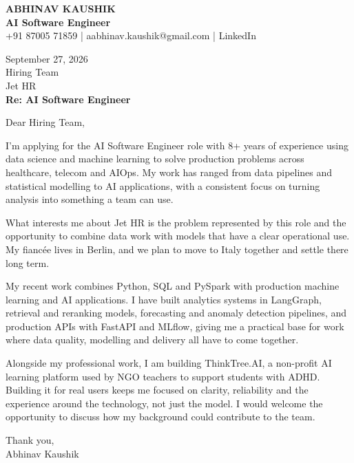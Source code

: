 \documentclass[10pt,a4paper]{article}
\begin{document}
\begin{center}
{\Large\bfseries ABHINAV KAUSHIK}\\[2pt]
{\bfseries AI Software Engineer}\\[2pt]
+91 87005 71859 \quad | \quad aabhinav.kaushik@gmail.com \quad | \quad LinkedIn
\end{center}
\vspace{8pt}
September 27, 2026\\[6pt]
Hiring Team\\
Jet HR\\[4pt]
\textbf{Re: AI Software Engineer}

Dear Hiring Team,

I’m applying for the AI Software Engineer role with 8+ years of experience using data science and machine learning to solve production problems across healthcare, telecom and AIOps. My work has ranged from data pipelines and statistical modelling to AI applications, with a consistent focus on turning analysis into something a team can use.

What interests me about Jet HR is the problem represented by this role and the opportunity to combine data work with models that have a clear operational use. My fiancée lives in Berlin, and we plan to move to Italy together and settle there long term.

My recent work combines Python, SQL and PySpark with production machine learning and AI applications. I have built analytics systems in LangGraph, retrieval and reranking models, forecasting and anomaly detection pipelines, and production APIs with FastAPI and MLflow, giving me a practical base for work where data quality, modelling and delivery all have to come together.

Alongside my professional work, I am building ThinkTree.AI, a non-profit AI learning platform used by NGO teachers to support students with ADHD. Building it for real users keeps me focused on clarity, reliability and the experience around the technology, not just the model. I would welcome the opportunity to discuss how my background could contribute to the team.

Thank you,\\
Abhinav Kaushik
\end{document}
